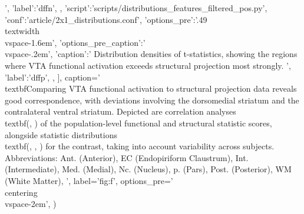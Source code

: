 \begin{sansmath}
{{                                ',
                        'label':'dffn',
                        },
                {'script':'scripts/distributions_features_filtered_pos.py', 'conf':'article/2x1_distributions.conf',
                        'options_pre':'{.49\\textwidth}\\vspace{-1.6em}',
                        'options_pre_caption':'\\vspace{-.2em}',
                        'caption':'
                                Distribution densities of t-statistics, showing the regions where VTA functional activation exceeds structural projection most strongly.
                                ',
                        'label':'dffp',
                        },
                ],
        caption='
                \\textbf{Comparing VTA functional activation to structural projection data reveals good correspondence, with deviations involving the dorsomedial striatum and the contralateral ventral striatum.}
                Depicted are correlation analyses \\textbf{(, )} of the population-level functional and structural statistic scores, alongside statistic distributions \\textbf{(, , )} for the contrast, taking into account variability across subjects.
                Abbreviations:
                Ant. (Anterior),
                EC (Endopiriform Claustrum),
                Int. (Intermediate),
                Med. (Medial),
                Nc. (Nucleus),
                p. (Pars),
                Post. (Posterior),
                WM (White Matter),
                ',
        label='fig:f',
        options_pre='\\centering\n\\vspace{-2em}',
        )}
\end{sansmath}

